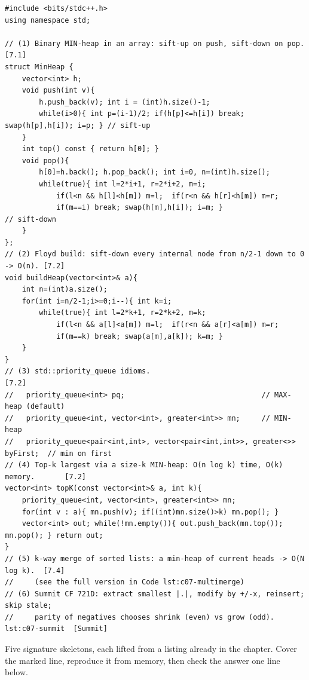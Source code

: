\begin{lstlisting}[caption={Chapter 10 code kit: hand sift push/pop, Floyd build, the priority\_queue idioms, a size-k top-k, the k-way merge, and the Summit loop}, label={lst:c07-kit}]
#include <bits/stdc++.h>
using namespace std;

// (1) Binary MIN-heap in an array: sift-up on push, sift-down on pop.        [7.1]
struct MinHeap {
    vector<int> h;
    void push(int v){
        h.push_back(v); int i = (int)h.size()-1;
        while(i>0){ int p=(i-1)/2; if(h[p]<=h[i]) break; swap(h[p],h[i]); i=p; } // sift-up
    }
    int top() const { return h[0]; }
    void pop(){
        h[0]=h.back(); h.pop_back(); int i=0, n=(int)h.size();
        while(true){ int l=2*i+1, r=2*i+2, m=i;
            if(l<n && h[l]<h[m]) m=l;  if(r<n && h[r]<h[m]) m=r;
            if(m==i) break; swap(h[m],h[i]); i=m; }                              // sift-down
    }
};
// (2) Floyd build: sift-down every internal node from n/2-1 down to 0 -> O(n). [7.2]
void buildHeap(vector<int>& a){
    int n=(int)a.size();
    for(int i=n/2-1;i>=0;i--){ int k=i;
        while(true){ int l=2*k+1, r=2*k+2, m=k;
            if(l<n && a[l]<a[m]) m=l;  if(r<n && a[r]<a[m]) m=r;
            if(m==k) break; swap(a[m],a[k]); k=m; }
    }
}
// (3) std::priority_queue idioms.                                              [7.2]
//   priority_queue<int> pq;                                // MAX-heap (default)
//   priority_queue<int, vector<int>, greater<int>> mn;     // MIN-heap
//   priority_queue<pair<int,int>, vector<pair<int,int>>, greater<>> byFirst;  // min on first
// (4) Top-k largest via a size-k MIN-heap: O(n log k) time, O(k) memory.       [7.2]
vector<int> topK(const vector<int>& a, int k){
    priority_queue<int, vector<int>, greater<int>> mn;
    for(int v : a){ mn.push(v); if((int)mn.size()>k) mn.pop(); }
    vector<int> out; while(!mn.empty()){ out.push_back(mn.top()); mn.pop(); } return out;
}
// (5) k-way merge of sorted lists: a min-heap of current heads -> O(N log k).  [7.4]
//     (see the full version in Code lst:c07-multimerge)
// (6) Summit CF 721D: extract smallest |.|, modify by +/-x, reinsert; skip stale;
//     parity of negatives chooses shrink (even) vs grow (odd). lst:c07-summit  [Summit]
\end{lstlisting}


Five signature skeletons, each lifted from a listing already in the chapter. Cover the marked line,
reproduce it from memory, then check the answer one line below.


